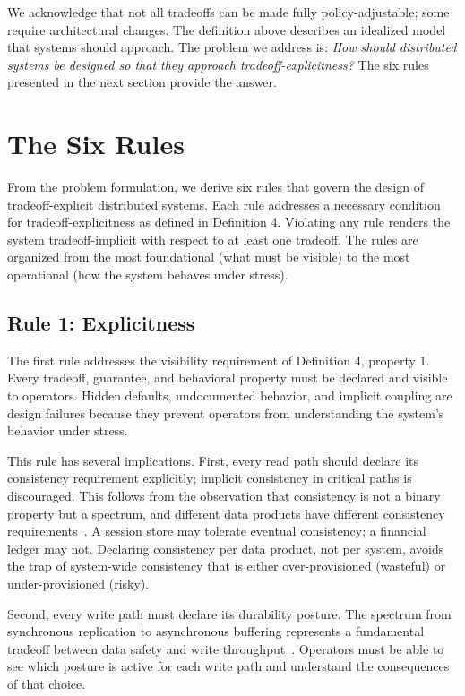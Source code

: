 \documentclass[conference]{IEEEtran}
\begin{document}
We acknowledge that not all tradeoffs can be made fully policy-adjustable; some require architectural changes. The definition above describes an idealized model that systems should approach. The problem we address is: \textit{How should distributed systems be designed so that they approach tradeoff-explicitness?} The six rules presented in the next section provide the answer.

\section{The Six Rules}

From the problem formulation, we derive six rules that govern the design of tradeoff-explicit distributed systems. Each rule addresses a necessary condition for tradeoff-explicitness as defined in Definition 4. Violating any rule renders the system tradeoff-implicit with respect to at least one tradeoff. The rules are organized from the most foundational (what must be visible) to the most operational (how the system behaves under stress).

\subsection{Rule 1: Explicitness}

The first rule addresses the visibility requirement of Definition 4, property 1. Every tradeoff, guarantee, and behavioral property must be declared and visible to operators. Hidden defaults, undocumented behavior, and implicit coupling are design failures because they prevent operators from understanding the system's behavior under stress.

This rule has several implications. First, every read path should declare its consistency requirement explicitly; implicit consistency in critical paths is discouraged. This follows from the observation that consistency is not a binary property but a spectrum, and different data products have different consistency requirements~\cite{dynamo}. A session store may tolerate eventual consistency; a financial ledger may not. Declaring consistency per data product, not per system, avoids the trap of system-wide consistency that is either over-provisioned (wasteful) or under-provisioned (risky).

Second, every write path must declare its durability posture. The spectrum from synchronous replication to asynchronous buffering represents a fundamental tradeoff between data safety and write throughput~\cite{raft}. Operators must be able to see which posture is active for each write path and understand the consequences of that choice.
\end{document}
